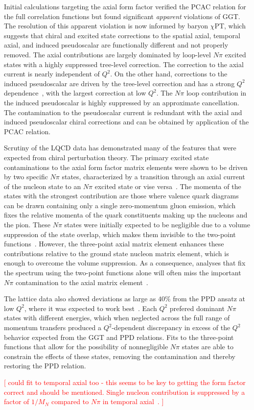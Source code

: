 Initial calculations targeting the axial form factor verified the PCAC relation
 for the full correlation functions but found significant \emph{apparent} violations
 of GGT. The resolution of this apparent violation
 is now informed by baryon $\chi$PT, which suggests that chiral
 and excited state corrections to the spatial axial, temporal axial, and induced pseudoscalar
 are functionally different and not properly removed.
The axial contributions are largely dominated by loop-level $N\pi$ excited states
 with a highly suppressed tree-level correction.
The correction to the axial current is nearly independent of $Q^2$.
On the other hand, corrections to the induced pseudoscalar are
 driven by the tree-level correction and has
 a strong $Q^2$ dependence~\cite{Bar:2018xyi}, with the largest correction at low $Q^2$.
The $N\pi$ loop contribution in the induced pseudoscalar is highly suppressed by
 an approximate cancellation.
The contamination to the pseudoscalar current is redundant with the
 axial and induced pseudoscalar chiral corrections and can be obtained
 by application of the PCAC relation.

Scrutiny of the LQCD data has demonstrated many of the features
 that were expected from chiral perturbation theory.
The primary excited state contaminations to the axial form factor matrix elements
 were shown to be driven by two specific $N\pi$ states,
 characterized by a transition through an axial current
 of the nucleon state to an $N\pi$ excited state or vise versa~\cite{Jang:2019vkm}.
The momenta of the states with the strongest contribution are those
 where valence quark diagrams can be drawn containing only a single
 zero-momentum gluon emission, which fixes the relative momenta of the
 quark constituents making up the nucleons and the pion.
These $N\pi$ states were initially expected to be negligible due to a volume suppression
 of the state overlap, which makes them invisible to the two-point functions~\cite{Bar:2016uoj}.
However, the three-point axial matrix element enhances these contributions relative
 to the ground state nucleon matrix element, which is enough to overcome the volume suppression.
As a consequence, analyses that fix the spectrum using the two-point functions alone
 will often miss the important $N\pi$ contamination to the
 axial matrix element~\cite{Jang:2019vkm,He:2021yvm}.

The lattice data also showed deviations as large as $40\%$ from the PPD
 ansatz at low $Q^2$, where it was expected to
 work best~\cite{Bali:2014nma,Gupta:2017dwj}.
Each $Q^2$ prefered dominant $N\pi$ states with different energies,
 which when neglected across the full range of momentum transfers
 produced a $Q^2$-dependent discrepancy in excess of the $Q^2$ behavior
 expected from the GGT and PPD relations.
Fits to the three-point functions that allow for the possibility of
 nonnegligible $N\pi$ states are able to constrain the effects of these states,
 removing the contamination and thereby restoring the PPD relation.

\textcolor{red}{[ could fit to temporal axial too
 - this seems to be key to getting the form factor correct and should be mentioned.
 Single nucleon contribution is suppressed by a factor of $1/M_N$ compared to $N\pi$
  in temporal axial~\cite{Bar:2018xyi}.
 ]}

